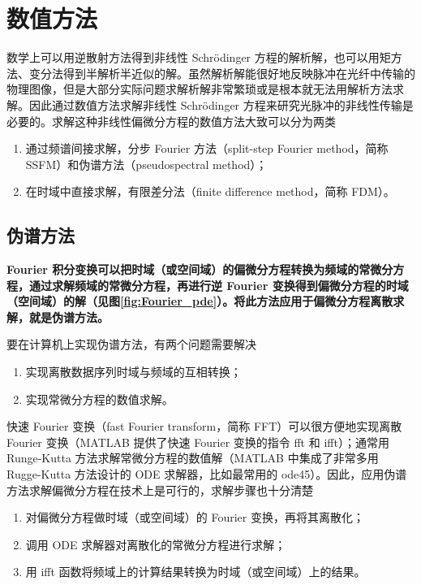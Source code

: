 \section{数值方法}
\label{sec:numerical}
数学上可以用逆散射方法得到非线性 Schr\"odinger 方程的解析解，也可以用矩方法、变分法得到半解析半近似的解。虽然解析解能很好地反映脉冲在光纤中传输的物理图像，但是大部分实际问题求解析解非常繁琐或是根本就无法用解析方法求解。因此通过数值方法求解非线性 Schr\"odinger 方程来研究光脉冲的非线性传输是必要的。求解这种非线性偏微分方程的数值方法大致可以分为两类
\begin{enumerate}[label=(\arabic*)]
    \item 通过频谱间接求解，分步 Fourier 方法（split-step Fourier method，简称 SSFM）和伪谱方法（pseudospectral method）；
    \item 在时域中直接求解，有限差分法（finite difference method，简称 FDM）。
\end{enumerate}
\subsection{伪谱方法}
{\bfseries Fourier 积分变换可以把时域（或空间域）的偏微分方程转换为频域的常微分方程，通过求解频域的常微分方程，再进行逆 Fourier 变换得到偏微分方程的时域（空间域）的解（见图\ref{fig:Fourier_pde}）。将此方法应用于偏微分方程离散求解，就是伪谱方法\cite{zhangxiao}。}

要在计算机上实现伪谱方法，有两个问题需要解决
\begin{enumerate}[label=(\arabic*)]
    \item 实现离散数据序列时域与频域的互相转换；
    \item 实现常微分方程的数值求解。
\end{enumerate}
快速 Fourier 变换（fast Fourier transform，简称 FFT）可以很方便地实现离散 Fourier 变换（MATLAB 提供了快速 Fourier 变换的指令 fft 和 ifft）；通常用 Runge-Kutta 方法求解常微分方程的数值解（MATLAB 中集成了非常多用 Rugge-Kutta 方法设计的 ODE 求解器，比如最常用的 ode45）\cite{Anne}。因此，应用伪谱方法求解偏微分方程在技术上是可行的，求解步骤也十分清楚\cite{zhangxiao}
\begin{enumerate}[label=(\arabic*)]
    \item 对偏微分方程做时域（或空间域）的 Fourier 变换，再将其离散化；
    \item 调用 ODE 求解器对离散化的常微分方程进行求解；
    \item 用 ifft 函数将频域上的计算结果转换为时域（或空间域）上的结果。
\end{enumerate}

